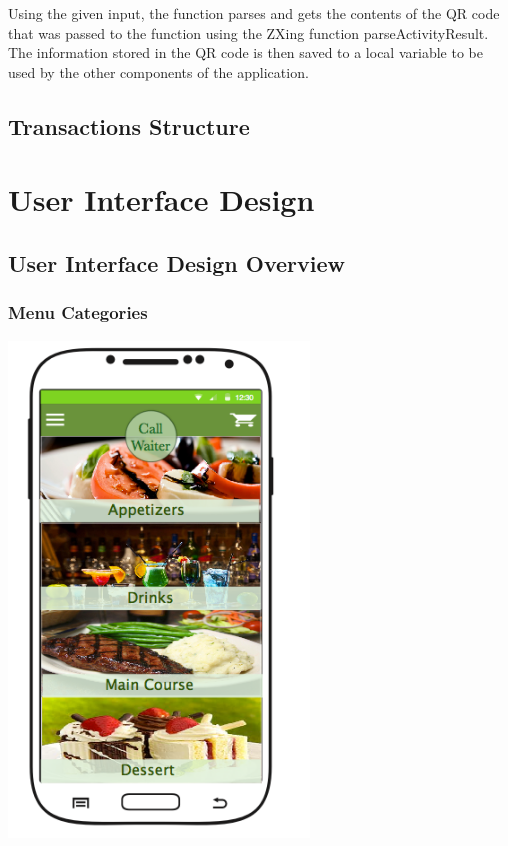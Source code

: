\documentclass[12pt, titlepage]{article}
\begin{document}
Using the given input, the function parses and gets the contents of the QR code that was passed to the function using the ZXing function parseActivityResult. The information stored in the QR code is then saved to a local variable to be used by the other components of the application.

\subsection{Transactions Structure}

\section{User Interface Design}

\subsection{User Interface Design Overview}

\subsubsection{Menu Categories}
\includegraphics[width=80mm,scale=0.5]{MenuCategories.png}
\end{document}
